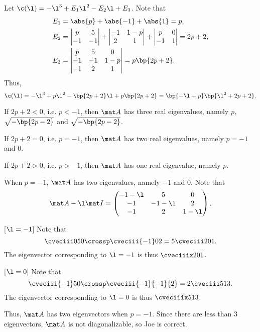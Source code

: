 \begin{solution}
    \begin{ppart}
        Let $\c(\l) = -\l^3 + E_1 \l^2 - E_2 \l + E_3$. Note that
        \begin{align*}
            E_1 &= \abs{p} + \abs{-1} + \abs{1} = p,\\
            E_2 &= \begin{vmatrix}p & 5 \\ -1 & - 1\end{vmatrix} + \begin{vmatrix}-1 & 1-p \\ 2 & 1\end{vmatrix} + \begin{vmatrix}p & 0 \\ -1 & 1\end{vmatrix} = 2p+2,\\
            E_3 &= \begin{vmatrix}p & 5 & 0 \\ -1 & - 1 & 1 - p \\ -1 & 2 & 1\end{vmatrix} = p\bp{2p+2}.
        \end{align*}
        Thus, \[\c(\l) = -\l^3 + p\l^2 - \bp{2p+2}\l + p \bp{2p+2} = \bp{-\l + p} \bp{\l^2 + 2p + 2}.\]

         If $2p + 2 < 0$, i.e. $p < -1$, then $\mat A$ has three real eigenvalues, namely $p$, $\sqrt{-\bp{2p- 2}}$ and $\sqrt{-\bp{2p-2}}$.

         If $2p + 2 = 0$, i.e. $p = -1$, then $\mat A$ has two real eigenvalues, namely $p = -1$ and $0$.

         If $2p + 2 > 0$, i.e. $p > -1$, then $\mat A$ has one real eigenvalue, namely $p$.
    \end{ppart}
    \begin{ppart}
        When $p = -1$, $\mat A$ has two eigenvalues, namely $-1$ and $0$. Note that \[\mat A - \l \mat I = \begin{pmatrix}-1-\l & 5 & 0 \\ -1 & - 1-\l & 2 \\ -1 & 2 & 1-\l\end{pmatrix}.\]

        [$\l = -1$] Note that \[\cveciii050 \crossp \cveciii{-1}02 = 5\cveciii201.\] The eigenvector corresponding to $\l = -1$ is thus $\cveciiix201$.

        [$\l = 0$] Note that \[\cveciii{-1}50 \crossp \cveciii{-1}{-1}{2} = 2\cveciii513.\] The eigenvector corresponding to $\l = 0$ is thus $\cveciiix513$.

        Thus, $\mat A$ has two eigenvectors when $p = -1$. Since there are less than 3 eigenvectors, $\mat A$ is not diagonalizable, so Joe is correct.
    \end{ppart}
\end{solution}